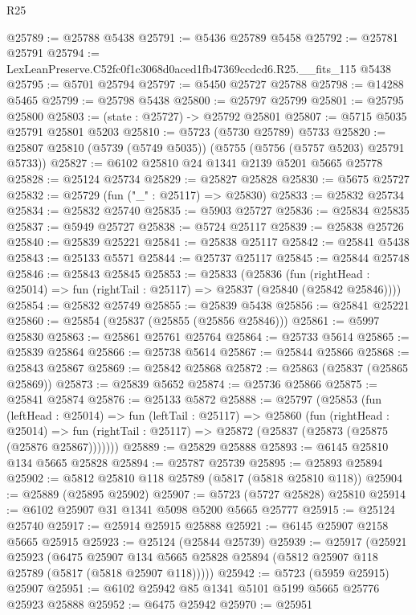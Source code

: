 \begin{lexlean}{R25}
\begin{coremodule}
@25789 := @25788 @5438
@25791 := @5436 @25789 @5458
@25792 := @25781 @25791
@25794 := LexLeanPreserve.C52fc0f1c3068d0aced1fb47369ccdcd6.R25.__fits_115 @5438
@25795 := @5701 @25794
@25797 := @5450 @25727 @25788
@25798 := @14288 @5465
@25799 := @25798 @5438
@25800 := @25797 @25799
@25801 := @25795 @25800
@25803 := (state : @25727) -> @25792 @25801
@25807 := @5715 @5035 @25791 @25801 @5203
@25810 := @5723 (@5730 @25789) @5733
@25820 := @25807 @25810 (@5739 (@5749 @5035)) (@5755 (@5756 (@5757 @5203) @25791 @5733))
@25827 := @6102 @25810 @24 @1341 @2139 @5201 @5665 @25778
@25828 := @25124 @25734
@25829 := @25827 @25828
@25830 := @5675 @25727
@25832 := @25729 (fun ("_" : @25117) => @25830)
@25833 := @25832 @25734
@25834 := @25832 @25740
@25835 := @5903 @25727
@25836 := @25834 @25835
@25837 := @5949 @25727
@25838 := @5724 @25117
@25839 := @25838 @25726
@25840 := @25839 @25221
@25841 := @25838 @25117
@25842 := @25841 @5438
@25843 := @25133 @5571
@25844 := @25737 @25117
@25845 := @25844 @25748
@25846 := @25843 @25845
@25853 := @25833
    (@25836
      (fun (rightHead : @25014) => fun (rightTail : @25117) => @25837 (@25840 (@25842 @25846))))
@25854 := @25832 @25749
@25855 := @25839 @5438
@25856 := @25841 @25221
@25860 := @25854 (@25837 (@25855 (@25856 @25846)))
@25861 := @5997 @25830
@25863 := @25861 @25761 @25764
@25864 := @25733 @5614
@25865 := @25839 @25864
@25866 := @25738 @5614
@25867 := @25844 @25866
@25868 := @25843 @25867
@25869 := @25842 @25868
@25872 := @25863 (@25837 (@25865 @25869))
@25873 := @25839 @5652
@25874 := @25736 @25866
@25875 := @25841 @25874
@25876 := @25133 @5872
@25888 := @25797
    (@25853
      (fun (leftHead : @25014) =>
      fun (leftTail : @25117) =>
      @25860
        (fun (rightHead : @25014) =>
        fun (rightTail : @25117) => @25872 (@25837 (@25873 (@25875 (@25876 @25867)))))))
@25889 := @25829 @25888
@25893 := @6145 @25810 @134 @5665 @25828
@25894 := @25787 @25739
@25895 := @25893 @25894
@25902 := @5812 @25810 @118 @25789 (@5817 (@5818 @25810 @118))
@25904 := @25889 (@25895 @25902)
@25907 := @5723 (@5727 @25828) @25810
@25914 := @6102 @25907 @31 @1341 @5098 @5200 @5665 @25777
@25915 := @25124 @25740
@25917 := @25914 @25915 @25888
@25921 := @6145 @25907 @2158 @5665 @25915
@25923 := @25124 (@25844 @25739)
@25939 := @25917
    (@25921
      @25923
      (@6475
        @25907
        @134
        @5665
        @25828
        @25894
        (@5812 @25907 @118 @25789 (@5817 (@5818 @25907 @118)))))
@25942 := @5723 (@5959 @25915) @25907
@25951 := @6102 @25942 @85 @1341 @5101 @5199 @5665 @25776 @25923 @25888
@25952 := @6475 @25942
@25970 := @25951

\end{coremodule}
\end{lexlean}
